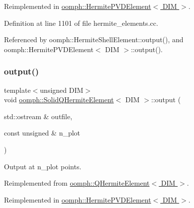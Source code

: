 Reimplemented in \hyperlink{classoomph_1_1HermitePVDElement_aa0e10a14a3b005e07d74c9fa99e47d48}{oomph\+::\+Hermite\+P\+V\+D\+Element$<$ D\+I\+M $>$}.



Definition at line 1101 of file hermite\+\_\+elements.\+cc.



Referenced by oomph\+::\+Hermite\+Shell\+Element\+::output(), and oomph\+::\+Hermite\+P\+V\+D\+Element$<$ D\+I\+M $>$\+::output().

\mbox{\label{classoomph_1_1SolidQHermiteElement_ab86bacc26f319f3266e6de9cfc5b82af}} 
\subsubsection{\texorpdfstring{output()}{output()}\hspace{0.1cm}{\footnotesize\ttfamily [2/8]}}
{\footnotesize\ttfamily template$<$unsigned D\+IM$>$ \\
void \hyperlink{classoomph_1_1SolidQHermiteElement}{oomph\+::\+Solid\+Q\+Hermite\+Element}$<$ D\+IM $>$\+::output (\begin{DoxyParamCaption}\item[{std\+::ostream \&}]{outfile,  }\item[{const unsigned \&}]{n\+\_\+plot }\end{DoxyParamCaption})\hspace{0.3cm}{\ttfamily [virtual]}}



Output at n\+\_\+plot points. 



Reimplemented from \hyperlink{classoomph_1_1QHermiteElement_a8053b3b58ea769a5e7be72982d594c0d}{oomph\+::\+Q\+Hermite\+Element$<$ D\+I\+M $>$}.



Reimplemented in \hyperlink{classoomph_1_1HermitePVDElement_a9de8d6a3b4e844189a97eb19e7b034c1}{oomph\+::\+Hermite\+P\+V\+D\+Element$<$ D\+I\+M $>$}.

\mbox{\label{classoomph_1_1SolidQHermiteElement_ae4f251ca932301e92e1b897cec6f0459}} 
